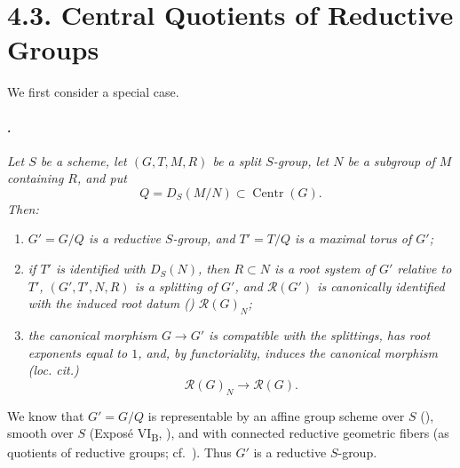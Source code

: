 \section*{4.3. Central
Quotients of Reductive Groups}

We first consider a special case.

\paragraph{.}
\textit{Let \(S\) be a scheme, let \((G,T,M,R)\) be a split
\(S\)-group, let \(N\) be a subgroup of \(M\) containing \(R\),
and put}
\[
  Q=D_S(M/N)\subset\operatorname{Centr}(G).
\]
\textit{Then:}

\begin{enumerate}
\item[\textup{(i)}]
\textit{\(G'=G/Q\) is a reductive \(S\)-group, and \(T'=T/Q\) is a
maximal torus of \(G'\);}

\item[\textup{\SGAInlineRefTarget{sga3:xxii:prop:4.3.1:item:ii}(ii)}]
\textit{if \(T'\) is identified with \(D_S(N)\), then \(R\subset N\)
is a root system of \(G'\) relative to \(T'\),
\((G',T',N,R)\) is a splitting of \(G'\), and
\(\mathscr R(G')\) is canonically identified with the induced root
datum \textup{()} \(\mathscr R(G)_N\);}

\item[\textup{(iii)}]
\textit{the canonical morphism \(G\to G'\) is compatible with the
splittings, has root exponents equal to \(1\), and, by
functoriality, induces the canonical morphism \textup{(loc. cit.)}}
\[
  \mathscr R(G)_N\longrightarrow\mathscr R(G).
\]
\end{enumerate}

We know that \(G'=G/Q\) is representable by an affine group scheme
over \(S\) \textup{()}, smooth over \(S\)
\textup{(Exposé VI\textsubscript{B}, )}, and with connected
reductive geometric fibers \textup{(as quotients of reductive
groups; cf.\ )}. Thus \(G'\) is a reductive
\(S\)-group.

